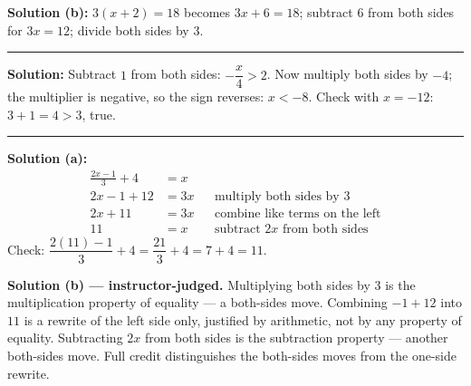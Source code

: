 \documentclass[12pt]{article}
\begin{document}
\noindent\textbf{Solution (b):} \quad $3(x + 2) = 18$ becomes $3x + 6 = 18$; subtract $6$ from both
sides for $3x = 12$; divide both sides by $3$. 

\vspace{0.15cm}\noindent\rule{\linewidth}{0.2pt}


\textbf{Solution:} \quad Subtract $1$ from both sides: $-\dfrac{x}{4} > 2$. Now multiply both sides
by $-4$; the multiplier is negative, so the sign reverses: $x < -8$. Check with $x = -12$:
$3 + 1 = 4 > 3$, true. 

\vspace{0.15cm}\noindent\rule{\linewidth}{0.2pt}


\textbf{Solution (a):}
\begin{align*}
  \frac{2x - 1}{3} + 4 &= x\\
  2x - 1 + 12 &= 3x &&\text{multiply both sides by } 3\\
  2x + 11 &= 3x &&\text{combine like terms on the left}\\
  11 &= x &&\text{subtract } 2x \text{ from both sides}
\end{align*}
Check: $\dfrac{2(11) - 1}{3} + 4 = \dfrac{21}{3} + 4 = 7 + 4 = 11$. 

\noindent\textbf{Solution (b) --- instructor-judged.} Multiplying both sides by $3$ is the
multiplication property of equality --- a both-sides move. Combining $-1 + 12$ into $11$ is a
rewrite of the left side only, justified by arithmetic, not by any property of equality. Subtracting
$2x$ from both sides is the subtraction property --- another both-sides move. Full credit
distinguishes the both-sides moves from the one-side rewrite.
\end{document}
